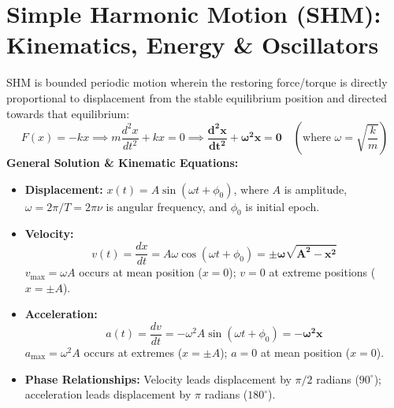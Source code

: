 \documentclass[10pt,twoside,openright]{book}
\begin{document}
\section{Simple Harmonic Motion (SHM): Kinematics, Energy \& Oscillators}

\begin{conceptbox}
SHM is bounded periodic motion wherein the restoring force/torque is directly proportional to displacement from the stable equilibrium position and directed towards that equilibrium:
\begin{equation}
  F(x) = -k x \implies m \frac{d^2 x}{dt^2} + k x = 0 \implies \mathbf{\frac{d^2 x}{dt^2} + \omega^2 x = 0} \quad \left(\text{where } \omega = \sqrt{\frac{k}{m}}\right)
\end{equation}
\textbf{General Solution \& Kinematic Equations:}
\begin{itemize}
  \item \textbf{Displacement:} $x(t) = A \sin(\omega t + \phi_0)$, where $A$ is amplitude, $\omega = 2\pi/T = 2\pi\nu$ is angular frequency, and $\phi_0$ is initial epoch.
  \item \textbf{Velocity:}
  \begin{equation}
    v(t) = \frac{dx}{dt} = A\omega \cos(\omega t + \phi_0) = \mathbf{\pm \omega \sqrt{A^2 - x^2}}
  \end{equation}
  $v_{\max} = \omega A$ occurs at mean position ($x=0$); $v=0$ at extreme positions ($x = \pm A$).
  \item \textbf{Acceleration:}
  \begin{equation}
    a(t) = \frac{dv}{dt} = -\omega^2 A \sin(\omega t + \phi_0) = \mathbf{-\omega^2 x}
  \end{equation}
  $a_{\max} = \omega^2 A$ occurs at extremes ($x = \pm A$); $a=0$ at mean position ($x=0$).
  \item \textbf{Phase Relationships:} Velocity leads displacement by $\pi/2$ radians ($90^\circ$); acceleration leads displacement by $\pi$ radians ($180^\circ$).
\end{itemize}
\end{conceptbox}
\end{document}
